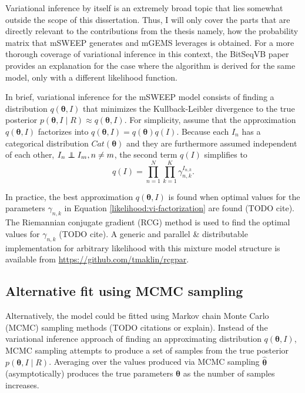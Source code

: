 \documentclass[officiallayout]{tktla}
\newcommand\indept{\protect\mathpalette{\protect\independenT}{\perp}}
\def\independenT#1#2{\mathrel{\rlap{$#1#2$}\mkern2mu{#1#2}}}
\begin{document}
Variational inference by itself is an extremely broad topic that lies
somewhat outside the scope of this dissertation. Thus, I will only
cover the parts that are directly relevant to the contributions from
the thesis \textemdash{ } namely, how the probability matrix that mSWEEP
generates and mGEMS leverages is obtained. For a more thorough
coverage of variational inference in this context, the BitSeqVB paper
\citep{hensman2015fast} provides an explanation for the case where the
algorithm is derived for the same model, only with a different
likelihood function.

In brief, variational inference for the mSWEEP model consists of
finding a distribution $q\left(\boldsymbol\theta, I\right)$ that
minimizes the Kullback-Leibler divergence to the true posterior
$p\left(\boldsymbol\theta, I \middle| R\right) \approx
q\left(\boldsymbol\theta, I\right)$. For simplicity, assume that the
approximation $q\left(\boldsymbol\theta, I\right)$ factorizes into
$q\left(\boldsymbol\theta, I\right) =
q\left(\boldsymbol\theta\right)q\left(I\right)$. Because each $I_{n}$
has a categorical distribution $Cat\left(\boldsymbol\theta\right)$ and
they are furthermore assumed independent of each other, $I_{n} \indept
I_{m}, n \neq m$, the second term $q\left(I\right)$ simplifies to
\begin{equation}
  \label{likelihood:vi-factorization}
  q\left(I\right) = \prod_{n = 1}^N\prod_{k = 1}^K \gamma_{n, k}^{I_{n, k}}.
\end{equation}

In practice, the best approximation $q\left(\boldsymbol\theta,
I\right)$ is found when optimal values for the parameters $\gamma_{n,
  k}$ in Equation \eqref{likelihood:vi-factorization} are found (TODO
cite). The Riemannian conjugate gradient (RCG) method is used to find the
optimal values for $\gamma_{n, k}$ (TODO cite). A generic and parallel
\& distributable implementation for arbitrary likelihood with this
mixture model structure is available from
\url{https://github.com/tmaklin/rcgpar}.

\subsection{Alternative fit using MCMC sampling}
Alternatively, the model could be fitted using Markov chain Monte
Carlo (MCMC) sampling methods (TODO citations or explain). Instead of
the variational inference approach of finding an approximating
distribution $q\left(\boldsymbol\theta, I\right)$, MCMC sampling
attempts to produce a set of samples from the true posterior
$p\left(\boldsymbol\theta, I\middle| R\right)$. Averaging over the
values produced via MCMC sampling $\hat{\boldsymbol\theta}$
(asymptotically) produces the true parameters $\boldsymbol\theta$ as
the number of samples increases.
\end{document}
